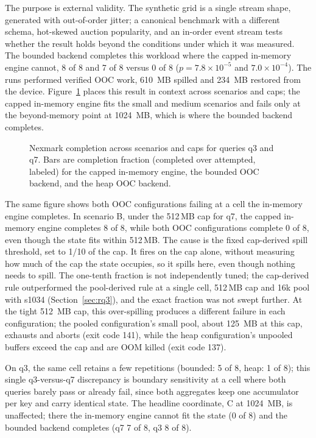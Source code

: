 The purpose is external validity.
The synthetic grid is a single stream shape, generated with out-of-order jitter; a canonical benchmark with a different schema, hot-skewed auction popularity, and an in-order event stream tests whether the result holds beyond the conditions under which it was measured.
The bounded backend completes this workload where the capped in-memory engine cannot, 8 of 8 and 7 of 8 versus 0 of 8 ($p = 7.8 \times 10^{-5}$ and $7.0 \times 10^{-4}$).
The runs performed verified \ac{OOC} work, 610\, MB spilled and 234\, MB restored from the device.
Figure~\ref{fig:nexmark-sweep} places this result in context across scenarios and caps; the capped in-memory engine fits the small and medium scenarios and fails only at the beyond-memory point at 1024\, MB, which is where the bounded backend completes.

\begin{figure}[htbp]
\centering
{}
\caption[Nexmark completion across scenarios and caps]{Nexmark completion
across scenarios and caps for queries q3 and q7. Bars are completion fraction
(completed over attempted, labeled) for the capped in-memory engine, the
bounded \ac{OOC} backend, and the heap \ac{OOC} backend.\nexmarknote}
\label{fig:nexmark-sweep}
\end{figure}

The same figure shows both \ac{OOC} configurations failing at a cell the in-memory engine completes.
In scenario B, under the 512\,MB cap for q7, the capped in-memory engine completes 8 of 8, while both \ac{OOC} configurations complete 0 of 8, even though the state fits within 512\,MB.
The cause is the fixed cap-derived spill threshold, set to 1/10 of the cap.
It fires on the cap alone, without measuring how much of the cap the state occupies, so it spills here, even though nothing needs to spill.
The one-tenth fraction is not independently tuned; the cap-derived rule outperformed the pool-derived rule at a single cell, 512\,MB cap and 16k pool with s1034 (Section~\ref{sec:rq3}), and the exact fraction was not swept further.
At the tight 512\, MB cap, this over-spilling produces a different failure in each configuration; the pooled configuration's small pool, about 125\, MB at this cap, exhausts and aborts (exit code 141), while the heap configuration's unpooled buffers exceed the cap and are OOM killed (exit code 137).

On q3, the same cell retains a few repetitions (bounded: 5 of 8, heap: 1 of 8); this single q3-versus-q7 discrepancy is boundary sensitivity at a cell where both queries barely pass or already fail, since both aggregates keep one accumulator per key and carry identical state.
The headline coordinate, C at 1024\, MB, is unaffected; there the in-memory engine cannot fit the state (0 of 8) and the bounded backend completes (q7 7 of 8, q3 8 of 8).

